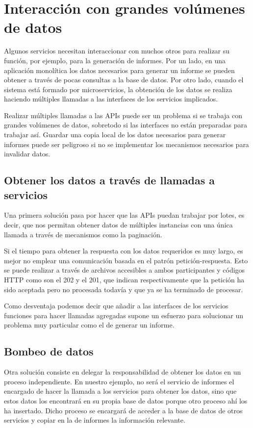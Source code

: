 \documentclass[11pt,a4paper]{article}
\begin{document}
\section{Interacción con grandes volúmenes de datos}

Algunos servicios necesitan interaccionar con muchos otros para realizar su función, por ejemplo, para la generación de informes. Por un lado, en una aplicación monolítica los datos necesarios para generar un informe se pueden obtener a través de pocas consultas a la base de datos. Por otro lado, cuando el sistema está formado por microservicios, la obtención de los datos se realiza haciendo múltiples llamadas a las interfaces de los servicios implicados.

Realizar múltiples llamadas a las APIs puede ser un problema si se trabaja con grandes volúmenes de datos, sobretodo si las interfaces no están preparadas para trabajar así. Guardar una copia local de los datos necesarios para generar informes puede ser peligroso si no se implementar los mecanismos necesarios para invalidar datos. 

\subsection{Obtener los datos a través de llamadas a servicios}

Una primera solución pasa por hacer que las APIs puedan trabajar por lotes, es decir, que nos permitan obtener datos de múltiples instancias con una única llamada a través de mecanismos como la paginación. 

Si el tiempo para obtener la respuesta con los datos requeridos es muy largo, es mejor no emplear una comunicación basada en el patrón petición-respuesta. Esto se puede realizar a través de archivos accesibles a ambos participantes y códigos HTTP como son el 202 y el 201, que indican respectivamente que la petición ha sido aceptada pero no procesada todavía y que ya se ha terminado de procesar.

Como desventaja podemos decir que añadir a las interfaces de los servicios funciones para hacer llamadas agregadas supone un esfuerzo para solucionar un problema muy particular como el de generar un informe.

\subsection{Bombeo de datos}

Otra solución consiste en delegar la responsabilidad de obtener los datos en un proceso independiente. En nuestro ejemplo, no será el servicio de informes el encargado de hacer la llamada a los servicios para obtener los datos, sino que estos datos los encontrará en su propia base de datos porque otro proceso ahí los ha insertado. Dicho proceso se encargará de acceder a la base de datos de otros servicios y copiar en la de informes la información relevante. 
\end{document}
